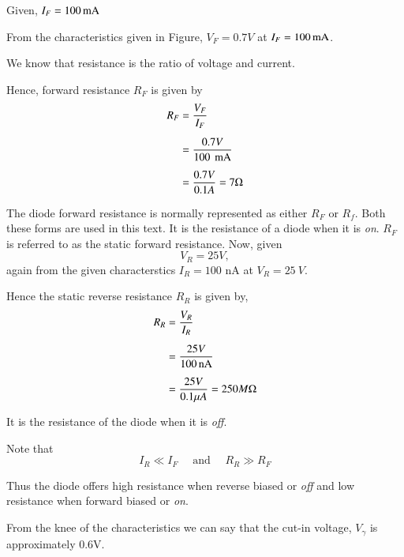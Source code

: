 \begin{solution}
Given, $I_F = 100 \operatorname{mA}$

From the characteristics given in Figure, $V_F = 0.7V$ at $I_F = 100
\operatorname{mA}$.

We know that resistance is the ratio of voltage and current.

Hence, forward resistance $R_F$ is given by
\begin{align*}
R_F & = \frac{V_F}{I_F}\\[5pt]
& = \frac{0.7V}{100~ \operatorname{mA}}\\[5pt]
& = \frac{0.7 V}{0.1 A} = 7 \Omega
\end{align*}

The diode forward resistance is normally represented as either $R_F$
or $R_f$. Both these forms are used in this text. It is the resistance
of a diode when it is {\it on}. $R_F$ is referred to as the static
forward resistance. Now, given 
$$
V_R = 25 V,
$$
again from the given characterstics $I_R = 100$ nA at $V_R = 25~ V$.

Hence the static reverse resistance $R_R$ is given by, 
\begin{align*}
R_R & = \frac{V_R}{I_R}\\[5pt]
& = \frac{25 V}{100\text{\,nA}}\\[5pt]
& = \frac{25 V}{0.1 \mu A} = 250 M \Omega
\end{align*}

It is the resistance of the diode when it is {\it off}.

Note that 
$$
I_R \ll I_F \quad \text{ and }\quad  R_R \gg R_F
$$

Thus the diode offers high resistance when reverse biased or {\it off}
and low resistance when forward biased or {\em on}. 

From the knee of the characteristics we can say that the cut-in
voltage, $V_\gamma$ is approximately 0.6V.
\end{solution}

\eject

